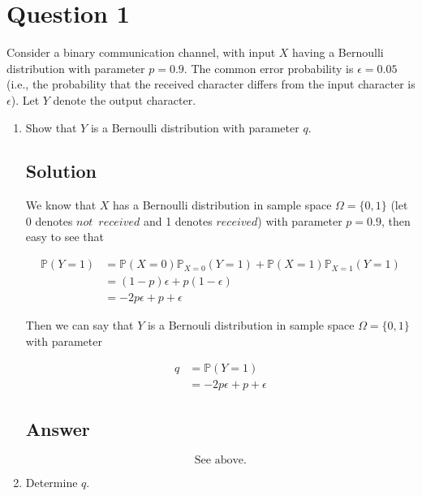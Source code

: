 \documentclass[12pt]{article}
\newcommand{\bP}{\mathbb{P}}
\begin{document}
	
	\section*{Question 1}
	
	\noindent Consider a binary communication channel, with input $X$ having a Bernoulli distribution with parameter $p = 0.9$. The common error probability is $\epsilon = 0.05$ (i.e., the probability that the received character differs from the input character is $\epsilon$). Let $Y$ denote the output character.
	
	\bigskip
	
	\begin{enumerate}[start=1,label={\bfseries Part \arabic*:},leftmargin=0in]
		\bigskip\item Show that $Y$ is a Bernoulli distribution with parameter $q$.
		
		\subsection*{Solution}
		
			We know that $X$ has a Bernoulli distribution in sample space $\Omega = \{0,1\}$ (let 0 denotes $not\enspace received$ and 1 denotes $received$) with parameter $p = 0.9$, then easy to see that
			
			\[
			\begin{aligned}
				\bP(Y=1) &= \bP(X=0)\bP_{X=0}(Y=1) + \bP(X=1)\bP_{X=1}(Y=1)\\
				&= (1-p)\epsilon + p(1-\epsilon)\\
				&= -2p\epsilon + p + \epsilon
			\end{aligned}
			\]
			
			Then we can say that $Y$ is a Bernouli distribution in sample space $\Omega = \{0,1\}$ with parameter
			
			\[
			\begin{aligned}
				q &= \bP(Y = 1)\\
				&= -2p\epsilon + p + \epsilon
			\end{aligned}
			\]
		
		\subsection*{Answer}
		
			\[\boxed{\text{See above.}}\]
		
		\bigskip\item Determine $q$.
		

\end{enumerate}
\end{document}
